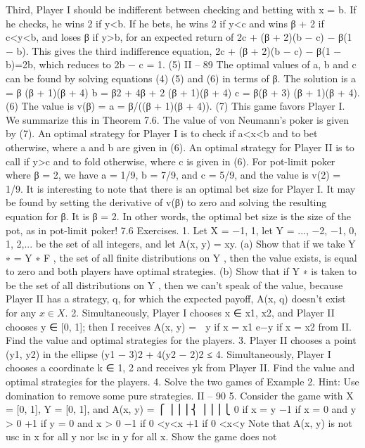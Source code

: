 \documentclass[]{report}
\begin{document}
Third, Player I should be indifferent between checking and betting with x = b. If he
checks, he wins 2 if y<b. If he bets, he wins 2 if y<c and wins β + 2 if c<y<b, and
loses β if y>b, for an expected return of 2c + (β + 2)(b − c) − β(1 − b). This gives the
third indifference equation,
2c + (β + 2)(b − c) − β(1 − b)=2b,
which reduces to
2b − c = 1. (5)
II – 89
The optimal values of a, b and c can be found by solving equations (4) (5) and (6) in
terms of β. The solution is
a = β
(β + 1)(β + 4) b = β2 + 4β + 2
(β + 1)(β + 4) c = β(β + 3)
(β + 1)(β + 4). (6)
The value is
v(β) = a = β/((β + 1)(β + 4)). (7)
This game favors Player I. We summarize this in
Theorem 7.6. The value of von Neumann’s poker is given by (7). An optimal strategy
for Player I is to check if a<x<b and to bet otherwise, where a and b are given in (6).
An optimal strategy for Player II is to call if y>c and to fold otherwise, where c is given
in (6).
For pot-limit poker where β = 2, we have a = 1/9, b = 7/9, and c = 5/9, and the
value is v(2) = 1/9.
It is interesting to note that there is an optimal bet size for Player I. It may be found
by setting the derivative of v(β) to zero and solving the resulting equation for β. It is
β = 2. In other words, the optimal bet size is the size of the pot, as in pot-limit poker!
7.6 Exercises.
1. Let X = {−1, 1}, let Y = {..., −2, −1, 0, 1, 2,...} be the set of all integers, and let
A(x, y) = xy.
(a) Show that if we take Y ∗ = Y ∗
F , the set of all finite distributions on Y , then the
value exists, is equal to zero and both players have optimal strategies.
(b) Show that if Y ∗ is taken to be the set of all distributions on Y , then we can’t speak
of the value, because Player II has a strategy, q, for which the expected payoff, A(x, q)
doesn’t exist for any $x \in X$.
2. Simultaneously, Player I chooses x ∈ {x1, x2}, and Player II chooses y ∈ [0, 1]; then
I receives
A(x, y) =  y if x = x1
e−y if x = x2
from II. Find the value and optimal strategies for the players.
3. Player II chooses a point (y1, y2) in the ellipse (y1 − 3)2 + 4(y2 − 2)2 ≤ 4. Simultaneously,
Player I chooses a coordinate k ∈ {1, 2} and receives yk from Player II. Find the
value and optimal strategies for the players.
4. Solve the two games of Example 2. Hint: Use domination to remove some pure
strategies.
II – 90
5. Consider the game with X = [0, 1], Y = [0, 1], and
A(x, y) =
⎧
⎪⎪⎪⎨
⎪⎪⎪⎩
0 if x = y
−1 if x = 0 and y > 0
+1 if y = 0 and x > 0
−1 if 0 <y<x
+1 if 0 <x<y
Note that A(x, y) is not usc in x for all y nor lsc in y for all x. Show the game does not
\end{document}
